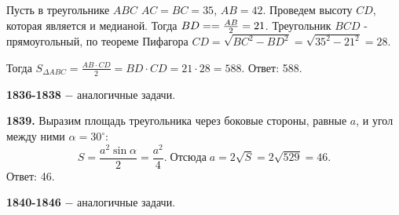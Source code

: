 Пусть в треугольнике $ABC$ $AC = BC = 35$, $AB = 42$. Проведем высоту $CD$, которая является и медианой. Тогда $BD = \linebreak =\frac{AB}{2} = 21$. Треугольник  $BCD$ - прямоугольный, по теореме Пифагора $CD = \sqrt{BC^2 - BD^2} = \sqrt{35^2 - 21^2} = 28.$

Тогда $S_{\Delta ABC} = \frac{AB \cdot CD}{2} = BD \cdot CD = 21 \cdot 28 = 588.$ \newline \null \hspace*{\fill} Ответ: 588.

\textbf{1836-1838} $-$ аналогичные задачи.

\textbf{1839.}  Выразим площадь треугольника через боковые стороны, равные $a$, и угол между ними $\alpha = 30^\circ$:
\[
S = \frac{a^2 \sin{\alpha}}{2} = \frac{a^2}{4}.\; Отсюда \;a = 2\sqrt{S} = 2\sqrt{529} = 46.
\] \null \hspace*{\fill} Ответ: 46.

\textbf{1840-1846} $-$ аналогичные задачи.